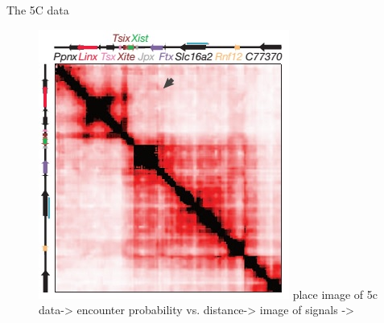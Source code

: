 \documentclass[8pt]{beamer}
\begin{document}
\begin{frame}{The 5C data}
\begin{figure}[H]
\includegraphics[scale=0.3]{tadDandENoraEtAl2012}
place image of 5c data-> encounter probability vs. distance-> image of signals -> 
\end{figure}

\end{frame}
\end{document}
